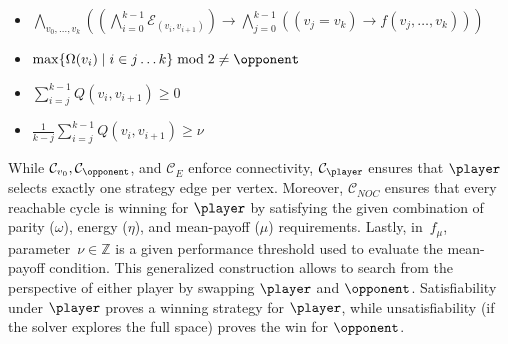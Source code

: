 \documentclass[a4paper,UKenglish,cleveref, autoref, thm-restate, anonymous]{lipics-v2021}
\begin{document}
\begin{definition}
\begin{itemize}[leftmargin=2.5cm, labelwidth=1.7cm, align=left, itemsep=1.0ex, parsep=0pt]
        

        \item [$\mathcal{C}_{NOC}(f)$ :] $\bigwedge_{v_0, \dots, v_k} \left( \left(\bigwedge_{i=0}^{k-1} \mathcal{E}_{(v_i,v_{i+1})}\right) \to \bigwedge_{j=0}^{k-1} ((v_j = v_k) \to f(v_j, \dots, v_k)) \right)$

    \end{itemize}
    \begin{itemize}[leftmargin=3.3cm, itemsep=1.0ex, parsep=0pt]
        \item [$f_\omega(v_j, \dots, v_k) =$] $\max\{\Omega(v_i) \mid i\in j\dots k\} \bmod 2 \ne \opponent$

        \item [$f_\eta(v_j, \dots, v_k) =$] $\sum_{i=j}^{k-1} Q(v_i, v_{i+1}) \ge 0$

        \item [$f_\mu(v_j, \dots, v_k) =$] $\frac{1}{k-j} \sum_{i=j}^{k-1} Q(v_i, v_{i+1}) \ge \nu$
    \end{itemize}
\end{definition}

While $\mathcal{C}_{v_0}, \mathcal{C}_{\opponent}$, and $\mathcal{C}_{\!E}$ %
enforce connectivity, 
$\mathcal{C}_{\player}$ ensures that $\player$ selects exactly one strategy edge per vertex.  
Moreover, $\mathcal{C}_{\!N\!O\!C}$ ensures that every reachable cycle is winning for $\player$ by satisfying the given combination of parity ($\omega$), energy ($\eta$), and mean-payoff ($\mu$) requirements. Lastly, in~$f_\mu$, parameter~$\nu \in \mathbb{Z}$ is a given performance threshold used to evaluate the mean-payoff condition. This generalized construction allows \nocq to search from the perspective of either player by swapping $\player$ and $\opponent$. Satisfiability under $\player$ proves a winning strategy for $\player$, while unsatisfiability (if the solver explores the full space) proves the win for $\opponent$.
\end{document}
